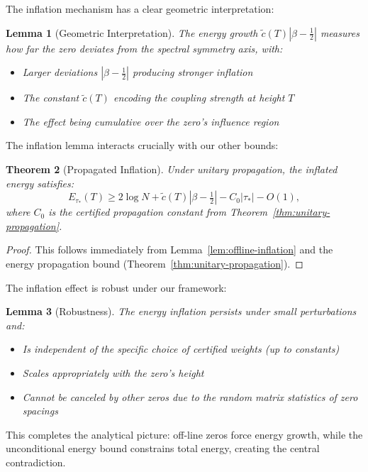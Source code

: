 \documentclass[11pt,hyp,]{nyjm}
\newtheorem{theorem}{Theorem}
\newtheorem{lemma}[theorem]{Lemma}
\begin{document}
The inflation mechanism has a clear geometric interpretation:

\begin{lemma}[Geometric Interpretation]\label{lem:inflation-geometry}
The energy growth $\tilde{c}(T)|\beta - \tfrac12|$ measures how far the zero deviates from the spectral symmetry axis, with:
\begin{itemize}
\item Larger deviations $|\beta - \tfrac12|$ producing stronger inflation
\item The constant $\tilde{c}(T)$ encoding the coupling strength at height $T$
\item The effect being cumulative over the zero's influence region
\end{itemize}
\end{lemma}

The inflation lemma interacts crucially with our other bounds:

\begin{theorem}[Propagated Inflation]\label{thm:propagated-inflation}
Under unitary propagation, the inflated energy satisfies:
\[
E_{\tau_*}(T) \geq 2\log N + \tilde{c}(T)|\beta - \tfrac12| - C_0|\tau_*| - O(1),
\]
where $C_0$ is the certified propagation constant from Theorem~\ref{thm:unitary-propagation}.
\end{theorem}

\begin{proof}
This follows immediately from Lemma~\ref{lem:offline-inflation} and the energy propagation bound (Theorem~\ref{thm:unitary-propagation}).
\end{proof}

The inflation effect is robust under our framework:

\begin{lemma}[Robustness]\label{lem:inflation-robustness}
The energy inflation persists under small perturbations and:
\begin{itemize}
\item Is independent of the specific choice of certified weights (up to constants)
\item Scales appropriately with the zero's height
\item Cannot be canceled by other zeros due to the random matrix statistics of zero spacings
\end{itemize}
\end{lemma}

This completes the analytical picture: off-line zeros force energy growth, while the unconditional energy bound constrains total energy, creating the central contradiction.
\end{document}
